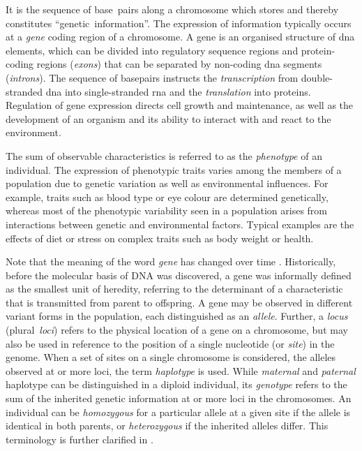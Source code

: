%

%

It is the sequence of base~pairs along a chromosome which stores and thereby constitutes ``genetic~information''.
The expression of information typically occurs at a \emph{gene} coding region of a chromosome.
A gene is an organised structure of \gls{dna} elements, which can be divided into regulatory sequence regions and protein-coding regions (\emph{exons}) that can be separated by non-coding \gls{dna} segments (\emph{introns}).
The sequence of basepairs instructs the \emph{transcription} from double-stranded \gls{dna} into single-stranded \gls{rna} and the \emph{translation} into proteins.
Regulation of gene expression directs cell growth and maintenance, as well as the development of an organism and its ability to interact with and react to the environment.

The sum of observable characteristics is referred to as the \emph{phenotype} of an individual.
The expression of phenotypic traits varies among the members of a population due to genetic variation as well as environmental influences.
For example, traits such as blood type or eye colour are determined genetically, whereas most of the phenotypic variability seen in a population arises from interactions between genetic and environmental factors.
Typical examples are the effects of diet or stress on complex traits such as body weight or health.

Note that the meaning of the word \emph{gene} has changed over time \citep[\eg see][]{slack2014genes}.
Historically, before the molecular basis of DNA was discovered, a gene was informally defined as the smallest unit of heredity, referring to the determinant of a characteristic that is transmitted from parent to offspring.
A gene may be observed in different variant forms in the population, each distinguished as an \emph{allele}.
Further, a \emph{locus} (plural~\emph{loci}) refers to the physical location of a gene on a chromosome, but may also be used in reference to the position of a single nucleotide (or \emph{site}) in the genome.
When a set of sites on a single chromosome is considered, \ie the alleles observed at  or more loci, the term \emph{haplotype} is used.
While  \emph{maternal} and  \emph{paternal} haplotype can be distinguished in a diploid individual, its \emph{genotype} refers to the sum of the inherited genetic information at  or more loci in the  chromosomes.
An individual can be \emph{homozygous} for a particular allele at a given site if the allele is identical in both parents, or \emph{heterozygous} if the inherited alleles differ.
This terminology is further clarified in .

